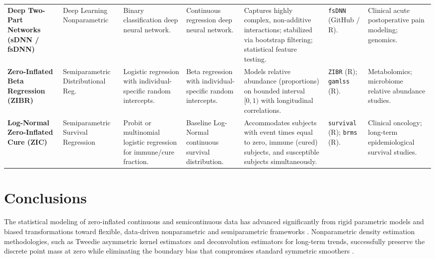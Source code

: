 \begin{landscape}
\begin{table}[p]
\begin{tabularx}{\linewidth}{p{2.2cm} p{2cm} p{2.2cm} p{2.2cm} X p{1.8cm} p{2.2cm}}
\addlinespace
\textbf{Deep Two-Part Networks (sDNN / fsDNN)} \cite{zou2025sdnn, zou2025fsdnn} & Deep Learning Nonparametric & Binary classification deep neural network. \cite{zou2025sdnn} & Continuous regression deep neural network. \cite{zou2025sdnn} & Captures highly complex, non-additive interactions; stabilized via bootstrap filtering; statistical feature testing. \cite{zou2025sdnn} & \texttt{fsDNN} (GitHub / R). \cite{zou2025fsdnn, sdnn_github} & Clinical acute postoperative pain modeling; genomics. \cite{zou2025sdnn, zou2025selection} \\
\addlinespace
\textbf{Zero-Inflated Beta Regression (ZIBR)} \cite{zibr2016} & Semiparametric Distributional Reg. & Logistic regression with individual-specific random intercepts. \cite{zibr2016} & Beta regression with individual-specific random intercepts. \cite{zibr2016} & Models relative abundance (proportions) on bounded interval $[0, 1)$ with longitudinal correlations. \cite{zibr2016} & \texttt{ZIBR} (R); \texttt{gamlss} (R). \cite{manning2001, zibr2016} & Metabolomics; microbiome relative abundance studies. \cite{zibr2016, koslovsky2020} \\
\addlinespace
\textbf{Log-Normal Zero-Inflated Cure (ZIC)} \cite{cure_survival} & Semiparametric Survival Regression & Probit or multinomial logistic regression for immune/cure fraction. \cite{cure_survival} & Baseline Log-Normal continuous survival distribution. \cite{cure_survival} & Accommodates subjects with event times equal to zero, immune (cured) subjects, and susceptible subjects simultaneously. \cite{cure_survival} & \texttt{survival} (R); \texttt{brms} (R). \cite{brms2017, cure_survival} & Clinical oncology; long-term epidemiological survival studies. \cite{cure_survival} \\
\bottomrule
\end{tabularx}
\end{table}
\end{landscape}

\section{Conclusions}

The statistical modeling of zero-inflated continuous and semicontinuous data has advanced significantly from rigid parametric models and biased transformations toward flexible, data-driven nonparametric and semiparametric frameworks \cite{tweedie_kde, neelon2010, tobit1958}. Nonparametric density estimation methodologies, such as Tweedie asymmetric kernel estimators and deconvolution estimators for long-term trends, successfully preserve the discrete point mass at zero while eliminating the boundary bias that compromises standard symmetric smoothers \cite{tweedie_kde, lemyre2025}. 


